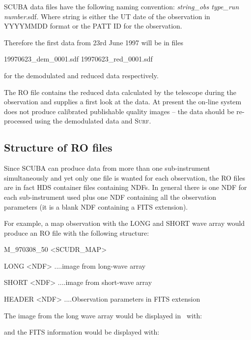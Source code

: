 \documentclass[twoside,11pt]{starlink}
\providecommand{\scusoft}          {\textsc{Surf}}
\providecommand{\Kappa}{\xref{{\textsc{Kappa}}}{sun95}{}}
\begin{document}
SCUBA data files have the following naming convention: \textit{string\_obs
type\_run number}.sdf. Where string is either the UT date of the observation
in YYYYMMDD format or the PATT ID for the observation.

Therefore the first data from 23rd June 1997 will be in files
\begin{terminalv}
19970623_dem_0001.sdf
19970623_red_0001.sdf
\end{terminalv}
for the demodulated and reduced data respectively.

The RO file contains the reduced data calculated by the telescope during the
observation and supplies a first look at the data. At present the on-line
system does not produce calibrated publishable quality images -- the data
should be re-processed using the demodulated data and \scusoft.

\subsection{Structure of RO files}

Since SCUBA can produce data from more than one sub-instrument simultaneously
and yet only one file is wanted for each observation, the RO files are in fact
HDS container files containing NDFs. In general there is one NDF for each
sub-instrument used plus one NDF containing all the observation parameters (it
is a blank NDF containing a FITS extension).

For example, a map observation with the LONG and SHORT wave array would
produce an RO file with the following structure:

\begin{terminalv}
M_970308_50  <SCUDR_MAP>

    LONG  <NDF>
        ....image from long-wave array

    SHORT <NDF>
        ....image from short-wave array

    HEADER <NDF>
        ....Observation parameters in FITS extension
\end{terminalv}


The image from the long wave array would be displayed in \Kappa\
with:
\begin{terminalv}
\end{terminalv}
and the FITS information would be displayed with:
\begin{terminalv}
\end{terminalv}
\end{document}

